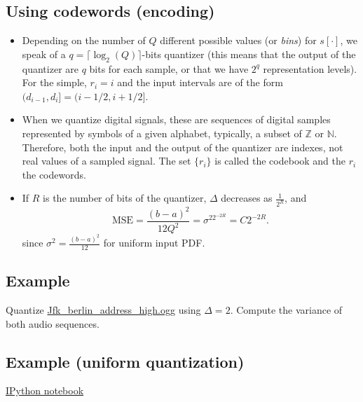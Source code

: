 \subsection{Using codewords (encoding)}
\begin{itemize}
  \tightlist
  
\item
  Depending on the number of \(Q\) different possible values (or
  \emph{bins}) for \(s[\cdot]\), we speak of a
  \(q=\lceil\log_2(Q)\rceil\)-bits quantizer (this means that the
  output of the quantizer are \(q\) bits for each sample, or that we
  have \(2^q\) representation levels). For the simple, $r_i=i$ and the
  input intervals are of the form $(d_{i-1},d_i]=(i-1/2,i+1/2]$.

\item
  When we quantize digital signals, these are sequences of digital
  samples represented by symbols of a given alphabet, typically, a
  subset of \({\mathbb{Z}}\) or \({\mathbb{N}}\). Therefore, both the
  input and the output of the quantizer are indexes, not real values
  of a sampled signal. The set $\{r_i\}$ is called the codebook and
  the $r_i$ the codewords.

\item If $R$ is the number of bits of the quantizer, $\Delta$
  decreases as $\frac{1}{2^R}$, and
  \begin{equation}
    \text{MSE} = \frac{(b-a)^2}{12Q^2} = \sigma^22^{-2R}=C2^{-2R}.
  \end{equation}
  since $\sigma^2=\frac{(b-a)^2}{12}$ for uniform input PDF. 
\end{itemize}

\subsection{Example}
Quantize
\href{https://upload.wikimedia.org/wikipedia/commons/3/3a/Jfk_berlin_address_high.ogg}{Jfk\_berlin\_address\_high.ogg}
using \(\Delta=2\). Compute the variance of both audio sequences.

\subsection*{Example (uniform quantization)}
\href{https://nbviewer.jupyter.org/github/vicente-gonzalez-ruiz/quantization/blob/master/uniform_quantization.ipynb}{IPython notebook}

